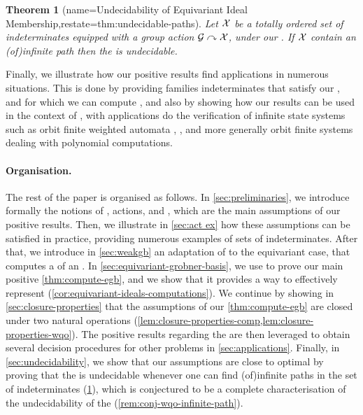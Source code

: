 \documentclass[11pt,a4paper,twosided]{article}
\newtheorem{theorem}{Theorem}
\theoremstyle{definition}
\newcommand{\group}{\mathcal{G}}
\newcommand{\actson}{\curvearrowright}
\begin{document}
\begin{theorem}[name={Undecidability of Equivariant Ideal Membership},restate=thm:undecidable-paths]
  \label{thm:undecidable-paths}
  Let $\mathcal{X}$ be a totally ordered set of indeterminates
  equipped with a group action $\group \actson \Indets$, under our .
  If $\mathcal{X}$ contain an \kl(of){infinite path}
  then the  is undecidable.
\end{theorem}

Finally, we illustrate how our positive results find applications in numerous
situations. This is done by providing families indeterminates that satisfy our
, and for which we can compute , and also by showing how our results can be used in the context
of  \cite{JGL10}, with
applications do the verification of infinite state systems such as orbit
finite weighted automata \cite{BOKLMO21}, , and more generally orbit finite systems dealing with polynomial
computations.

\paragraph{Organisation.} \AP The rest of the paper is organised as follows. In
\cref{sec:preliminaries}, we introduce formally the notions of ,  actions, and ,
which are the main assumptions of our positive results. Then, we illustrate in
\cref{sec:act ex} how these assumptions can be satisfied in practice, providing
numerous examples of sets of indeterminates. After that, we introduce in
\cref{sec:weakgb} an adaptation of  to the
equivariant case, that computes a  of an
. In \cref{sec:equivariant-grobner-basis}, we use
 to prove our main positive
\cref{thm:compute-egb}, and we show that it provides a way to effectively
represent  (\cref{cor:equivariant-ideals-computations}).
We continue by showing in \cref{sec:closure-properties} that the assumptions of our
\cref{thm:compute-egb} are closed under two natural operations
(\cref{lem:closure-properties-comp,lem:closure-properties-wqo}). The positive
results regarding the  are then
leveraged to obtain several decision procedures for other problems in
\cref{sec:applications}. Finally, in \cref{sec:undecidability}, we show that
our assumptions are close to optimal by proving that the  is undecidable whenever one can find \kl(of){infinite
paths} in the set of indeterminates (\cref{thm:undecidable-paths}), which is
conjectured to be a complete characterisation of the undecidability of the
 (\cref{rem:conj-wqo-infinite-path}).
%
%
\end{document}
